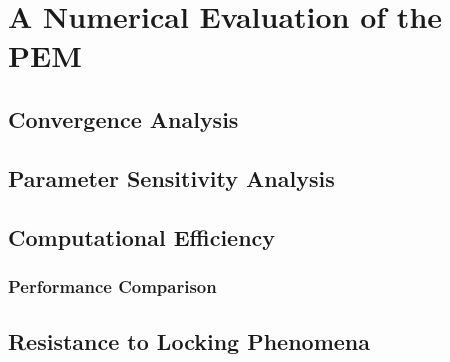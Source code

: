 \chapter{A Numerical Evaluation of the PEM}
%
\section{Convergence Analysis}

\section{Parameter Sensitivity Analysis}

\section{Computational Efficiency}
\subsection{Performance Comparison}

\section{Resistance to Locking Phenomena}
